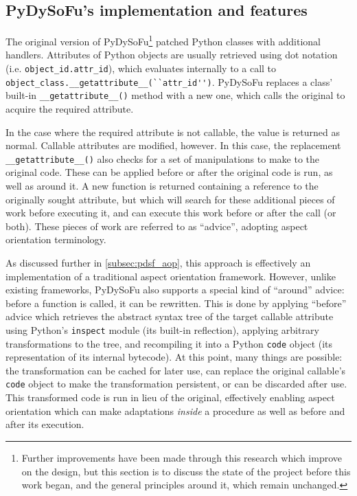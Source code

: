 \subsection{PyDySoFu's implementation and features}

The original version of PyDySoFu\footnote{Further improvements have been made
through this research which improve on the design, but this section is to
discuss the state of the project before this work began, and the general
principles around it, which remain unchanged.} patched Python classes with
additional handlers. Attributes of Python objects are usually retrieved using
dot notation (i.e. \lstinline{object_id.attr_id}), which evaluates internally to
a call to \lstinline{object_class.__getattribute__(``attr_id'')}. PyDySoFu replaces a
class' built-in \lstinline{__getattribute__()} method with a new one, which
calls the original to acquire the required attribute. 

In the case where the required attribute is not callable, the value is returned
as normal. Callable attributes are modified, however. In this case, the
replacement \lstinline{__getattribute__()} also checks for a set of
manipulations to make to the original code. These can be applied before or after
the original code is run, as well as around it. A new function is returned
containing a reference to the originally sought attribute, but which will search
for these additional pieces of work before executing it, and can execute this
work before or after the call (or both). These pieces of work are referred to as
``advice'', adopting aspect orientation terminology.

As discussed further in \cref{subsec:pdsf_aop}, this approach is effectively an
implementation of a traditional aspect orientation framework. However, unlike
existing frameworks, PyDySoFu also supports a special kind of ``around'' advice:
before a function is called, it can be rewritten. This is done by applying
``before'' advice which retrieves the abstract syntax tree of the target
callable attribute using Python's \lstinline{inspect} module (its built-in
reflection), applying arbitrary transformations to the tree, and recompiling it
into a Python \lstinline{code} object (its representation of its
internal bytecode). At this point, many things are possible: the transformation
can be cached for later use, can replace the original callable's
\lstinline{code} object to make the transformation persistent, or can be
discarded after use. This transformed code is run in lieu of the original,
effectively enabling aspect orientation which can make adaptations \emph{inside}
a procedure as well as before and after its execution.

